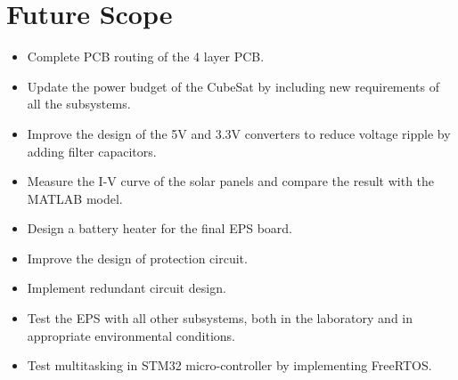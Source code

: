 \section{Future Scope}
\begin{itemize}
\item Complete PCB routing of the 4 layer PCB.
\item Update the power budget of the CubeSat by including new requirements of all the subsystems.
\item Improve the design of the 5V and 3.3V converters to reduce voltage ripple by adding filter capacitors.
\item Measure the I-V curve of the solar panels and compare the result with the MATLAB model.
\item Design a battery heater for the final EPS board.
\item Improve the design of protection circuit.
\item Implement redundant circuit design.
\item Test the EPS with all other subsystems, both in the laboratory and in appropriate environmental conditions.
\item Test multitasking in STM32 micro-controller by implementing FreeRTOS.
\end{itemize}